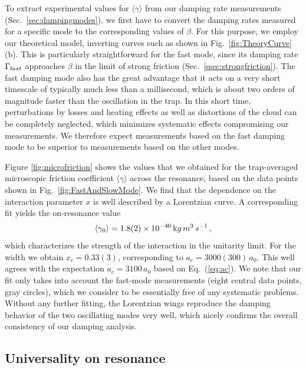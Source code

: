 To extract experimental values for $\langle \gamma \rangle$ from our damping rate measurements (Sec.~\ref{sec:dampingmodes}), we first have to convert the damping rates measured for a specific  mode to the corresponding values of $\beta$. For this purpose, we employ our theoretical model, inverting curves such as shown in Fig.~\ref{fig:TheoryCurve}(b).  
{This is particularly straightforward for the fast mode, since its damping rate $\Gamma_{\textrm fast}$ approaches $\beta$ in the limit of strong friction (Sec.~\ref{ssec:strongfriction}).}
The fast damping mode also has the great advantage that it acts on a very short timescale of typically much less than a millisecond, {which is about two orders of magnitude faster than the oscillation in the trap}. In this short time, perturbations by losses and heating effects as well as distortions of the cloud can be completely neglected, which minimizes systematic effects compromising our measurements. We therefore expect measurements based on the fast damping mode to be superior to measurements based on the other modes.

Figure \ref{fig:microfriction} shows the values that we obtained for the trap-averaged microscopic friction coefficient $\langle \gamma \rangle$ across the resonance, based on the data points shown in Fig.~\ref{fig:FastAndSlowMode}.
We find that the dependence on the interaction parameter $x$ is well described by a Lorentzian curve. A corresponding fit yields the on-resonance value
\begin{equation}
\langle \gamma_0 \rangle = 1.8(2) \times 10^{-40} \, {\textrm kg\,m^3\,s^{-1}} \, ,
\label{eq:gamma0}
\end{equation}
which characterizes the strength of the interaction in the unitarity limit. For the width we obtain $x_c = 0.33(3)$, corresponding to $a_c = 3000(300)\,a_0$. This well agrees with the expectation $a_c = 3100\,a_0$ based on Eq.~(\ref{eq:ac}).
We note that our fit only takes into account the fast-mode measurements (eight central data points, gray circles), which we consider to be essentially free of any systematic problems. Without any further fitting, the Lorentzian wings reproduce the damping behavior of the two oscillating modes very well, which nicely confirms the overall consistency of our damping analysis.

\subsection{Universality on resonance} \label{ssec:universality}

